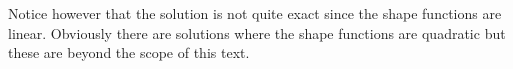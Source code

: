 \begin{enumerate}
Notice however that the solution is not quite exact since the shape
functions are linear. Obviously there are solutions where the shape
functions are quadratic but these are beyond the scope of this text.

\end{enumerate}
    



